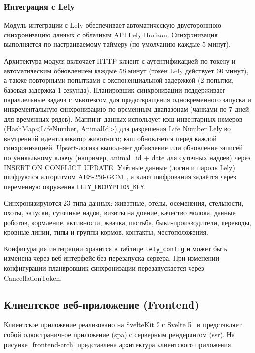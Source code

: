 \subsubsection{Интеграция с Lely}

Модуль интеграции с Lely обеспечивает автоматическую двустороннюю синхронизацию данных с облачным API Lely Horizon. Синхронизация выполняется по настраиваемому таймеру (по умолчанию каждые 5 минут).

Архитектура модуля включает HTTP-клиент с аутентификацией по токену и автоматическим обновлением каждые 58 минут (токен Lely действует 60 минут), а также повторными попытками с экспоненциальной задержкой (2 попытки, базовая задержка 1 секунда). Планировщик синхронизации поддерживает параллельные задачи с мьютексом для предотвращения одновременного запуска и инкрементальную синхронизацию по временным диапазонам (чанками по 7 дней для временных рядов). Маппинг данных использует кэш инвентарных номеров (HashMap<LifeNumber, AnimalId>) для разрешения Life Number Lely во внутренний идентификатор животного; кэш обновляется перед каждой синхронизацией. Upsert-логика выполняет добавление или обновление записей по уникальному ключу (например, animal\_id + date для суточных надоев) через INSERT ON CONFLICT UPDATE. Учётные данные (логин и пароль Lely) шифруются алгоритмом AES-256-GCM~\cite{AES-GCM}, а ключ шифрования задаётся через переменную окружения \texttt{LELY\_ENCRYPTION\_KEY}.

Синхронизируются 23 типа данных: животные, отёлы, осеменения, стельности, охоты, запуски, суточные надои, визиты на доение, качество молока, данные роботов, кормление, активности, жвачка, пастьба, быки-производители, переводы, кровные линии, типы и группы кормов, контакты, местоположения.

Конфигурация интеграции хранится в таблице \texttt{lely\_config} и может быть изменена через веб-интерфейс без перезапуска сервера. При изменении конфигурации планировщик синхронизации перезапускается через CancellationToken.

\subsection{Клиентское веб-приложение (Frontend)}

Клиентское приложение реализовано на SvelteKit 2 с Svelte 5~\cite{Svelte5} и представляет собой одностраничное приложение (\acrshort{spa}) с серверным рендерингом (\acrshort{ssr}). На рисунке~\ref{frontend-arch} представлена архитектура клиентского приложения.

